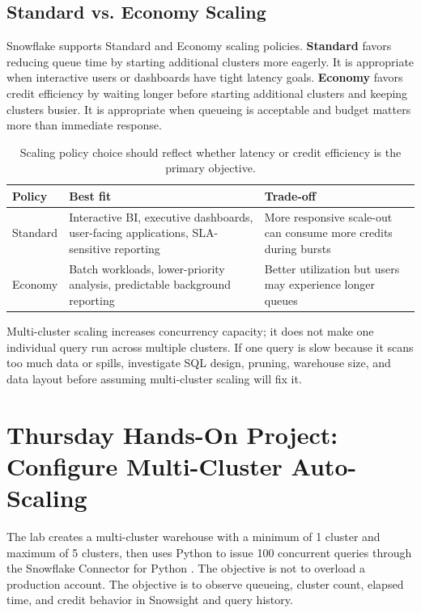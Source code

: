 \subsection{Standard vs. Economy Scaling}
Snowflake supports Standard and Economy scaling policies. \textbf{Standard} favors reducing queue time by starting additional clusters more eagerly. It is appropriate when interactive users or dashboards have tight latency goals. \textbf{Economy} favors credit efficiency by waiting longer before starting additional clusters and keeping clusters busier. It is appropriate when queueing is acceptable and budget matters more than immediate response.

\begin{table}[H]
\centering
\small
\begin{tabular}{@{}p{3.0cm}p{4.8cm}p{4.8cm}@{}}
\toprule
\textbf{Policy} & \textbf{Best fit} & \textbf{Trade-off} \\
\midrule
Standard & Interactive BI, executive dashboards, user-facing applications, SLA-sensitive reporting & More responsive scale-out can consume more credits during bursts \\
Economy & Batch workloads, lower-priority analysis, predictable background reporting & Better utilization but users may experience longer queues \\
\bottomrule
\end{tabular}
\caption{Scaling policy choice should reflect whether latency or credit efficiency is the primary objective.}
\label{tab:chapter2-scaling-policy}
\end{table}

\begin{notebox}
Multi-cluster scaling increases concurrency capacity; it does not make one individual query run across multiple clusters. If one query is slow because it scans too much data or spills, investigate SQL design, pruning, warehouse size, and data layout before assuming multi-cluster scaling will fix it.
\end{notebox}

\section{Thursday Hands-On Project: Configure Multi-Cluster Auto-Scaling}
The lab creates a multi-cluster warehouse with a minimum of 1 cluster and maximum of 5 clusters, then uses Python to issue 100 concurrent queries through the Snowflake Connector for Python \cite{snowflakeConnectorPythonDocs}. The objective is not to overload a production account. The objective is to observe queueing, cluster count, elapsed time, and credit behavior in Snowsight and query history.

